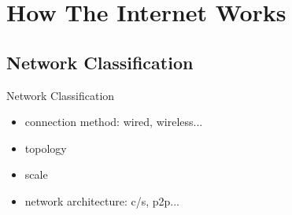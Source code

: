 \section{How The Internet Works}

\subsection[Classification]{Network Classification}

\begin{frame}{Network Classification}
  \begin{itemize}
  \item connection method: wired, wireless...
  \item topology
  \item scale
  \item network architecture: c/s, p2p...
  \end{itemize}
\end{frame}

